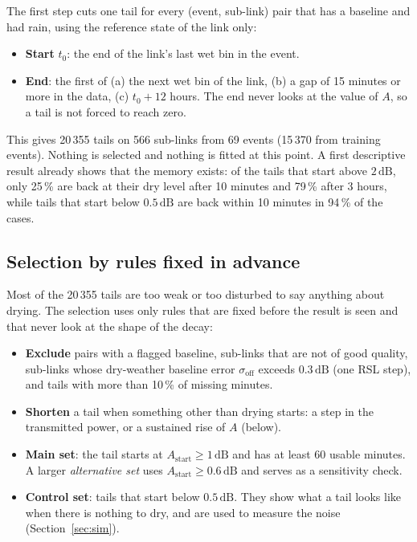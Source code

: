 \documentclass[11pt,a4paper]{article}
\newcommand{\dB}{\,\mathrm{dB}}
\newcommand{\tzero}{t_{0}}
\newcommand{\Astart}{A_{\mathrm{start}}}
\begin{document}
The first step cuts one tail for every (event, sub-link) pair that has a baseline and had rain, using the reference
state of the link only:
\begin{itemize}
\item \textbf{Start} $\tzero$: the end of the link's last wet bin in the event.
\item \textbf{End}: the first of (a) the next wet bin of the link, (b) a gap of 15 minutes or more in the data,
(c) $\tzero + 12$ hours. The end never looks at the value of $A$, so a tail is not forced to reach zero.
\end{itemize}
This gives 20\,355 tails on 566 sub-links from 69 events (15\,370 from training events). Nothing is selected and
nothing is fitted at this point. A first descriptive result already shows that the memory exists: of the tails that
start above $2\dB$, only 25\,\% are back at their dry level after 10 minutes and 79\,\% after 3 hours, while tails
that start below $0.5\dB$ are back within 10 minutes in 94\,\% of the cases.

\subsection{Selection by rules fixed in advance}

Most of the 20\,355 tails are too weak or too disturbed to say anything about drying. The selection uses only rules
that are fixed before the result is seen and that never look at the shape of the decay:
\begin{itemize}
\item \textbf{Exclude} pairs with a flagged baseline, sub-links that are not of good quality, sub-links whose
dry-weather baseline error $\sigma_{\mathrm{off}}$ exceeds $0.3\dB$ (one RSL step), and tails with more than 10\,\% of
missing minutes.
\item \textbf{Shorten} a tail when something other than drying starts: a step in the transmitted power, or a
sustained rise of $A$ (below).
\item \textbf{Main set}: the tail starts at $\Astart \geq 1\dB$ and has at least 60 usable minutes. A larger
\emph{alternative set} uses $\Astart \geq 0.6\dB$ and serves as a sensitivity check.
\item \textbf{Control set}: tails that start below $0.5\dB$. They show what a tail looks like when there is nothing
to dry, and are used to measure the noise (Section~\ref{sec:sim}).
\end{itemize}
\end{document}
